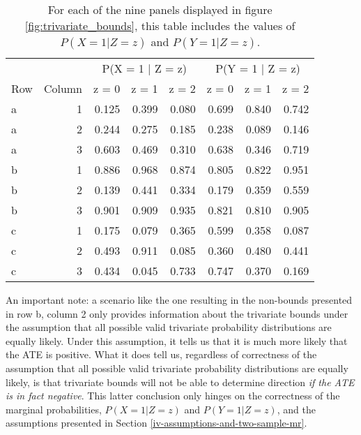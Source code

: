 \documentclass[
]{article}
\theoremstyle{plain}
\begin{document}
\begin{table}[h]
  \center
  
\begin{tabular}{l|r|r|r|r|r|r|r}
\hline
\multicolumn{2}{c|}{ } & \multicolumn{3}{c|}{P(X = 1 | Z = z)} & \multicolumn{3}{c}{P(Y = 1 | Z = z)} \\
\cline{3-5} \cline{6-8}
Row & Column & z = 0 & z = 1 & z = 2 & z = 0 & z = 1 & z = 2\\
\hline
a & 1 & 0.125 & 0.399 & 0.080 & 0.699 & 0.840 & 0.742\\
\hline
a & 2 & 0.244 & 0.275 & 0.185 & 0.238 & 0.089 & 0.146\\
\hline
a & 3 & 0.603 & 0.469 & 0.310 & 0.638 & 0.346 & 0.719\\
\hline
b & 1 & 0.886 & 0.968 & 0.874 & 0.805 & 0.822 & 0.951\\
\hline
b & 2 & 0.139 & 0.441 & 0.334 & 0.179 & 0.359 & 0.559\\
\hline
b & 3 & 0.901 & 0.909 & 0.935 & 0.821 & 0.810 & 0.905\\
\hline
c & 1 & 0.175 & 0.079 & 0.365 & 0.599 & 0.358 & 0.087\\
\hline
c & 2 & 0.493 & 0.911 & 0.085 & 0.360 & 0.480 & 0.441\\
\hline
c & 3 & 0.434 & 0.045 & 0.733 & 0.747 & 0.370 & 0.169\\
\hline
\end{tabular}


  \caption{For each of the nine panels displayed in figure \ref{fig:trivariate_bounds}, this table includes the values of $P(X = 1 | Z = z)$ and $P(Y = 1 | Z = z)$.}
  \label{tab:subset_plot_summaries_b}
\end{table}

An important note: a scenario like the one resulting in the non-bounds presented in row b, column 2 only provides information about the trivariate bounds under the assumption that all possible valid trivariate probability distributions are equally likely. Under this assumption, it tells us that it is much more likely that the ATE is positive. What it does tell us, regardless of correctness of the assumption that all possible valid trivariate probability distributions are equally likely, is that trivariate bounds will not be able to determine direction \emph{if the ATE is in fact negative}. This latter conclusion only hinges on the correctness of the marginal probabilities, \(P(X = 1 | Z = z)\) and \(P(Y = 1 | Z = z)\), and the assumptions presented in Section \ref{iv-assumptions-and-two-sample-mr}.
\end{document}

